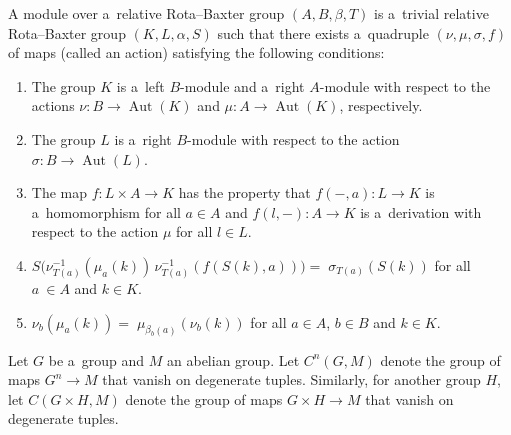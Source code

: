 \documentclass{jonasart}
\theoremstyle{plain}
\DeclareMathOperator{\Aut}{Aut}
\begin{document}
	\begin{definition}
		A module over a~relative Rota--Baxter group $(A, B,\beta, T)$ is a~trivial relative Rota--Baxter group $(K, L, \alpha, S)$ such that there exists a~quadruple $(\nu, \mu, \sigma, f)$ of maps (called an action) satisfying the following conditions:
		\begin{enumerate}
			\item The group $K$ is a~left $B$-module and a~right $A$-module with respect to the actions $\nu:B \to \Aut(K) $ and $\mu: A \to \Aut(K)$, respectively.
			\item The group $L$ is a~right $B$-module with respect to the action $\sigma: B \to \Aut(L)$.
			\item The map $f: L \times A \to K$ has the property that $f(-,a): L \rightarrow K$ is a~homomorphism for all $a \in A$ and $f(l,-): A \rightarrow K$ is a~derivation with respect to the action $\mu$ for all $l \in L$.
			\item $S\big(\nu^{-1}_{T(a)}(\mu_{a}(k)) \,\nu^{-1}_{T( a)}(f(S(k), a))\big)=\;\sigma_{T(a)}(S(k))$ for all $ a~\in A$ and $k \in K$.
			\item $\nu_b (\mu_{a}(k))= \; \mu_{ \beta{_{b}(a)}}( \nu_{b} (k))$ for all $a \in A$, $b \in B$ and $k \in K$.
		\end{enumerate}
	\end{definition}
	
	Let $G$ be a~group and $M$ an abelian group. Let $C^n (G, M)$ denote the group of maps $G^n \to M$ that vanish on degenerate tuples. Similarly, for another group $H$, let $C(G \times H, M)$ denote the group of maps $G \times H \to M$ that vanish on degenerate tuples.
	
\end{document}
